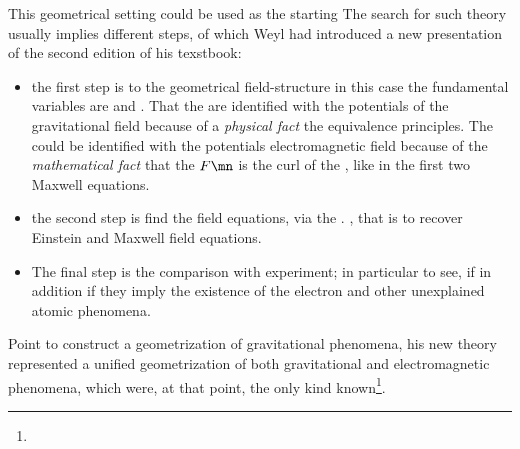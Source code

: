 {%

This geometrical setting could be used as the starting  The search for such theory usually implies different steps, of which Weyl had introduced a new presentation of the second edition of his texstbook:

\begin{itemize}
\item the first step is to the geometrical field-structure in this case the fundamental variables are \gmn and \phin. That the \gmn are identified with the potentials of the gravitational field because of a \emph{physical fact} the equivalence principles. The \phin could be identified with the potentials electromagnetic field  because of the \emph{mathematical fact} that the $F\mn$ is the curl of the \phin, like in the first two Maxwell equations. 

\item the second step is find the field equations, via the . , that is to recover Einstein and Maxwell field equations.

\item The final step is the comparison with experiment; in particular to see, if in addition if they imply the existence of the electron and other unexplained atomic phenomena.  
\end{itemize}

Point to construct a geometrization of gravitational phenomena, his new theory represented a unified geometrization of both gravitational and electromagnetic phenomena, which were, at that point, the only kind known\footnote{}.  \citep{Weyl116}

}
